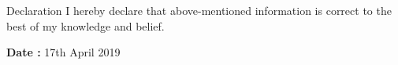 \documentclass{resume} %
\begin{document}
\newpage

\begin{rSection}{Declaration}
I hereby declare that above-mentioned information is correct to the best of my knowledge and belief. \\
\end{rSection}

{\bf Date : } 17th April 2019
\end{document}
